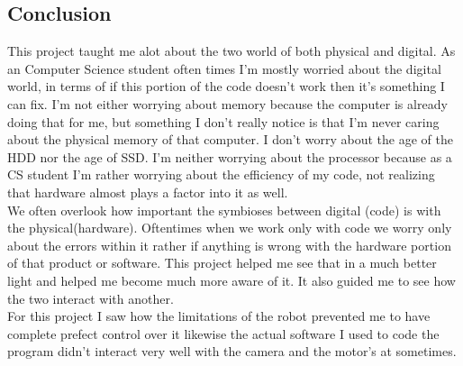 \documentclass[13ptletterpaper]{paper}
\newcommand\tab[1][1cm]{\hspace*{#1}}
\begin{document}
\begin{flushleft}
	\section{Conclusion}
	\tab This project taught me alot about the two world of both physical and digital. As an Computer Science student often times I'm mostly worried about the digital world, in terms of if this portion of the code doesn't work then it's something I can fix. I'm not either worrying about memory because the computer is already doing that for me, but something I don't really notice is that I'm never caring about the physical memory of that computer. I don't worry about the age of the HDD nor the age of SSD. I'm neither worrying about the processor because as a CS student I'm rather worrying about the efficiency of my code, not realizing that hardware almost plays a factor into it as well. \\
	\tab We often overlook how important the symbioses between digital (code) is with the physical(hardware). Oftentimes when we work only with code we worry only about the errors within it rather if anything is wrong with the hardware portion of that product or software. This project helped me see that in a much better light and helped me become much more aware of it. It also guided me to see how the two interact with another.\\
	\tab For this project I saw how the limitations of the robot prevented me to have complete prefect control over it likewise the actual software I used to code the program didn't interact very well with the camera and the motor's at sometimes.
\end{flushleft}	
\end{document}

